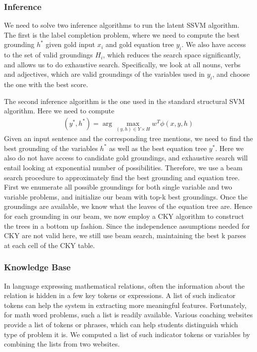     \subsubsection{Inference}
      We need to solve two inference algorithms to run the latent SSVM
      algorithm.  The first is the label completion problem, where we
      need to compute the best grounding $h^*$ given gold input $x_i$
      and gold equation tree $y_i$. We also have access to the set of
      valid groundings $H_i$, which reduces the search space
      significantly, and allows us to do exhaustive
      search. Specifically, we look at all nouns, verbs and
      adjectives, which are valid groundings of the variables used in
      $y_i$, and choose the one with the best score.

      The second inference algorithm is the one used in the standard
      structural SVM algorithm. Here we need to compute
      \begin{align*}
        (y^*, h^*) = \arg\max_{(y, h) \in Y \times H} w^T\phi(x, y, h)
      \end{align*}  
      Given an input sentence and the corresponding tree mentions, we
      need to find the best grounding of the variables $h^*$ as well
      as the best equation tree $y^*$. Here we also do not have access
      to candidate gold groundings, and exhaustive search will entail
      looking at exponential number of possibilities. Therefore, we
      use a beam search procedure to approximately find the best
      grounding and equation tree. First we enumerate all possible
      groundings for both single variable and two variable problems,
      and initialize our beam with top-k best groundings. Once the
      groundings are available, we know what the leaves of the
      equation tree are. Hence for each grounding in our beam, we now
      employ a CKY algorithm to construct the trees in a bottom up
      fashion. Since the independence assumptions needed for CKY are
      not valid here, we still use beam search, maintaining the best k
      parses at each cell of the CKY table. 
      
    \subsubsection{Knowledge Base} 
      In language expressing mathematical relations, often the
      information about the relation is hidden in a few key tokens or
      expressions. A list of such indicator tokens can help the system
      in extracting more meaningful features. Fortunately, for math
      word problems, such a list is readily available. Various
      coaching websites provide a list of tokens or phrases, which can
      help students distinguish which type of problem it is. We computed 
      a list of such indicator tokens or variables by combining the lists 
      from two websites.
      


      
      


    
    





